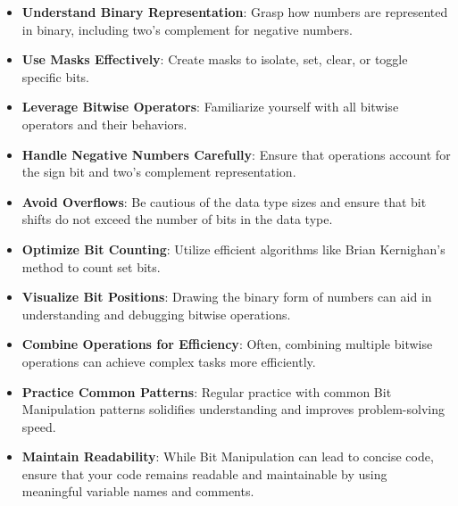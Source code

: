 \begin{itemize}
    \item \textbf{Understand Binary Representation}: Grasp how numbers are represented in binary, including two's complement for negative numbers.
    
    \item \textbf{Use Masks Effectively}: Create masks to isolate, set, clear, or toggle specific bits.
    
    \item \textbf{Leverage Bitwise Operators}: Familiarize yourself with all bitwise operators and their behaviors.
    
    \item \textbf{Handle Negative Numbers Carefully}: Ensure that operations account for the sign bit and two's complement representation.
    
    \item \textbf{Avoid Overflows}: Be cautious of the data type sizes and ensure that bit shifts do not exceed the number of bits in the data type.
    
    \item \textbf{Optimize Bit Counting}: Utilize efficient algorithms like Brian Kernighan’s method to count set bits.
    
    \item \textbf{Visualize Bit Positions}: Drawing the binary form of numbers can aid in understanding and debugging bitwise operations.
    
    \item \textbf{Combine Operations for Efficiency}: Often, combining multiple bitwise operations can achieve complex tasks more efficiently.
    
    \item \textbf{Practice Common Patterns}: Regular practice with common Bit Manipulation patterns solidifies understanding and improves problem-solving speed.
    
    \item \textbf{Maintain Readability}: While Bit Manipulation can lead to concise code, ensure that your code remains readable and maintainable by using meaningful variable names and comments.
\end{itemize}

